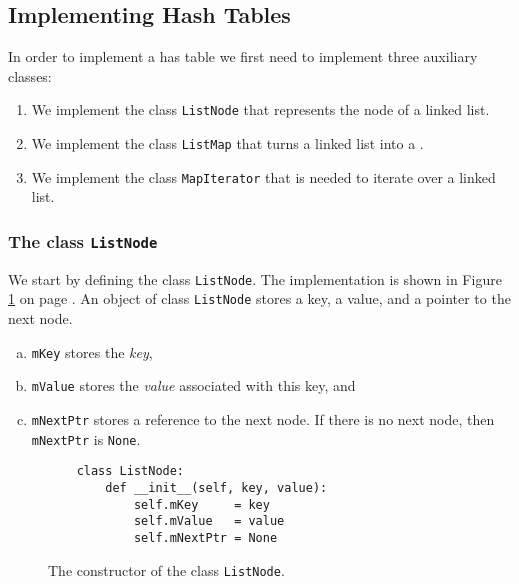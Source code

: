 \subsection{Implementing Hash Tables}
In order to implement a has table we first need to implement three auxiliary classes:
\begin{enumerate}
\item We implement the class \texttt{ListNode} that represents the node of a linked list.
\item We implement the class \texttt{ListMap} that turns a linked list into a .
\item We implement  the class \texttt{MapIterator} that is needed to iterate over a linked list.
\end{enumerate}

\subsubsection{The class \texttt{ListNode}}
We start by defining the class \texttt{ListNode}.
The implementation is shown in Figure \ref{fig:ListNode.ipynb} on page \pageref{fig:ListNode.ipynb}.
An object of class \texttt{ListNode} stores a key, a value, and a pointer to the next node.
\begin{enumerate}[(a)]
\item \texttt{mKey}     stores the \emph{key},
\item \texttt{mValue}   stores the \emph{value} associated with this key, and
\item \texttt{mNextPtr} stores a reference to the next node.  If there is no next node, then 
      \texttt{mNextPtr} is \texttt{None}.
\end{enumerate}

\begin{figure}[!ht]
\centering
\begin{verbatim}
    class ListNode:
        def __init__(self, key, value):
            self.mKey     = key
            self.mValue   = value
            self.mNextPtr = None                
\end{verbatim}
\vspace*{-0.3cm}
\caption{The constructor of the class \texttt{ListNode}.}
\label{fig:ListNode.ipynb}
\end{figure}

